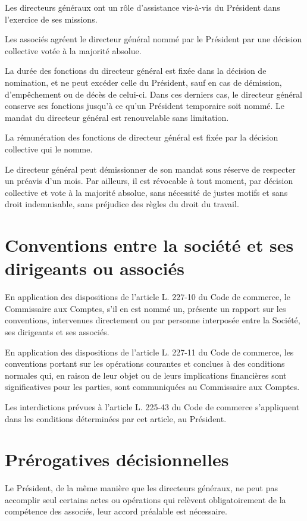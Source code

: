 \documentclass[a4paper,12pt]{report}
\begin{document}
Les directeurs généraux ont un rôle d'assistance vis-à-vis du Président dans l'exercice de ses missions.

Les associés agréent le directeur général nommé par le Président par une décision collective votée à la majorité absolue.

La durée des fonctions du directeur général est fixée dans la décision de nomination, et ne peut excéder celle du Président, sauf en cas de démission, 
d'empêchement ou de décès de celui-ci. 
Dans ces derniers cas, le directeur général conserve ses fonctions jusqu'à ce qu'un Président temporaire soit nommé. 
Le mandat du directeur général est renouvelable sans limitation.

La rémunération des fonctions de directeur général est fixée par la décision collective qui le nomme.

Le directeur général peut démissionner de son mandat sous réserve de respecter un préavis d'un mois. 
Par ailleurs, il est révocable à tout moment, par décision collective et vote à la majorité absolue, 
sans nécessité de justes motifs et sans droit indemnisable, sans préjudice des règles du droit du travail.

\section{Conventions entre la société et ses dirigeants ou associés}
En application des dispositions de l'article L. 227-10 du Code de commerce, le Commissaire aux Comptes, s'il en est nommé un, présente un rapport sur les conventions, 
intervenues directement ou par personne interposée entre la Société, ses dirigeants et ses associés.

En application des dispositions de l'article L. 227-11 du Code de commerce, les conventions portant sur les opérations courantes et conclues à des conditions normales qui, 
en raison de leur objet ou de leurs implications financières sont significatives pour les parties, sont communiquées au Commissaire aux Comptes.

Les interdictions prévues à l'article L. 225-43 du Code de commerce s'appliquent dans les conditions déterminées par cet article, au Président.

\section{Prérogatives décisionnelles}
Le Président, de la même manière que les directeurs généraux, ne peut pas accomplir seul certains actes ou opérations 
qui relèvent obligatoirement de la compétence des associés, leur accord préalable est nécessaire.
\end{document}
